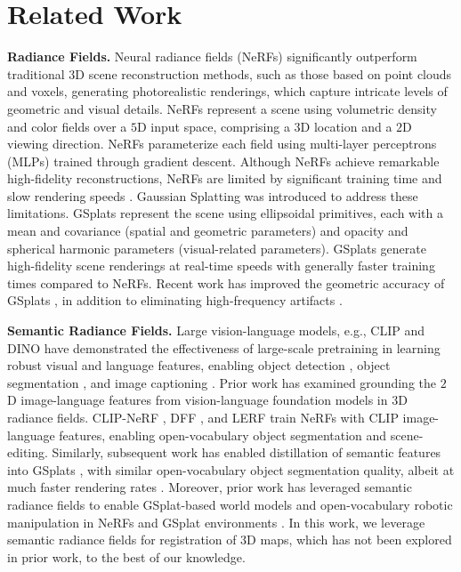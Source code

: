 \section{Related Work}
\label{sec:related_work}

\smallskip
\noindent\textbf{Radiance Fields.}
Neural radiance fields (NeRFs) \cite{mildenhall2021nerf} significantly outperform traditional $3$D scene reconstruction methods, such as those based on point clouds and voxels, generating photorealistic renderings, which capture intricate levels of geometric and visual details. NeRFs represent a scene using volumetric density and color fields over a $5$D input space, comprising a $3$D location and a $2$D viewing direction. NeRFs parameterize each field using multi-layer perceptrons (MLPs) trained through gradient descent. Although NeRFs achieve remarkable high-fidelity reconstructions, NeRFs are limited by significant training time and slow rendering speeds \cite{zhang2020nerf++, yu2021pixelnerf, barron2022mip}. Gaussian Splatting \cite{kerbl20233d} was introduced to address these limitations. GSplats represent the scene using ellipsoidal primitives, each with a mean and covariance (spatial and geometric parameters) and opacity and spherical harmonic parameters (visual-related parameters). GSplats generate high-fidelity scene renderings at real-time speeds with generally faster training times compared to NeRFs. Recent work has improved the geometric accuracy of GSplats \cite{guedon2024sugar, huang20242d}, in addition to eliminating high-frequency artifacts \cite{yu2024mip, lee2025deblurring}. 


\smallskip
\noindent\textbf{Semantic Radiance Fields.}
Large vision-language models, e.g., CLIP \cite{radford2021learning} and DINO \cite{caron2021emerging, oquab2023dinov2} have demonstrated the effectiveness of large-scale pretraining in learning robust visual and language features, enabling object detection \cite{gu2021open, minderer2022simple}, object segmentation \cite{wang2022cris, luddecke2022image}, and image captioning \cite{mokady2021clipcap, luo2022clip4clip}. Prior work has examined grounding the $2$D image-language features from vision-language foundation models in $3$D radiance fields. CLIP-NeRF \cite{wang2022clip}, DFF \cite{kobayashi2022decomposing}, and LERF \cite{kerr2023lerf} train NeRFs with CLIP image-language features, enabling open-vocabulary object segmentation and scene-editing. Similarly, subsequent work has enabled distillation of semantic features into GSplats \cite{qin2024langsplat, zhou2024feature}, with similar open-vocabulary object segmentation quality, albeit at much faster rendering rates \cite{shorinwa2024fast}. Moreover, prior work has leveraged semantic radiance fields to enable GSplat-based world models \cite{lu2025manigaussian} and open-vocabulary robotic manipulation in NeRFs \cite{shen2023distilled, rashid2023language} and GSplat environments \cite{shorinwa2024splat, ji2024graspsplats}. In this work, we leverage semantic radiance fields for registration of $3$D maps, which has not been explored in prior work, to the best of our knowledge.

